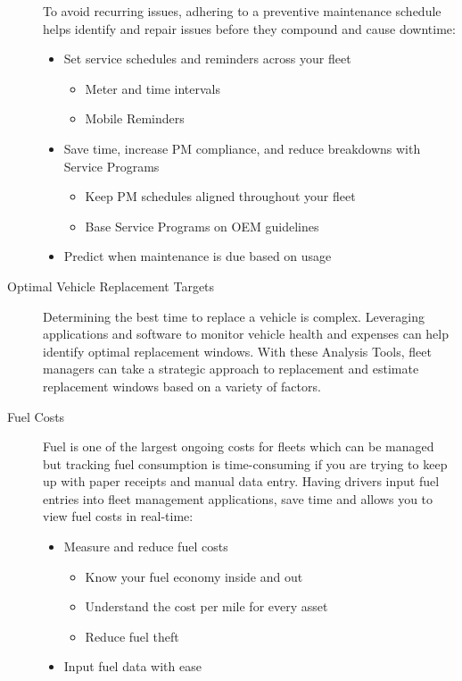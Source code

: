 \begin{description}
    To avoid recurring issues, adhering to a preventive maintenance schedule helps identify and repair issues before they compound and cause downtime:
    \begin{itemize}
    \item	Set service schedules and reminders across your fleet
        \begin{itemize}
            \item	Meter and time intervals
            \item Mobile Reminders 
        \end{itemize}
    \item	Save time, increase PM compliance, and reduce breakdowns with Service Programs
        \begin{itemize}
            \item	Keep PM schedules aligned throughout your fleet
            \item	Base Service Programs on OEM guidelines
        \end{itemize}
    \item	Predict when maintenance is due based on usage
    \end{itemize}
    \item [Optimal Vehicle Replacement Targets] Determining the best time to replace a vehicle is complex. Leveraging applications and software to monitor vehicle health and expenses can help identify optimal replacement windows. With these Analysis Tools, fleet managers can take a strategic approach to replacement and estimate replacement windows based on a variety of factors.
    \item [Fuel Costs] Fuel is one of the largest ongoing costs for fleets which can be managed but tracking fuel consumption is time-consuming if you are trying to keep up with paper receipts and manual data entry. Having drivers input fuel entries into fleet management applications, save time and allows you to view fuel costs in real-time:
    \begin{itemize}
    \item	Measure and reduce fuel costs
    \begin{itemize}
        \item 	Know your fuel economy inside and out
        \item	Understand the cost per mile for every asset
        \item	Reduce fuel theft
    \end{itemize}
    \item	Input fuel data with ease

\end{itemize}
\end{description}
